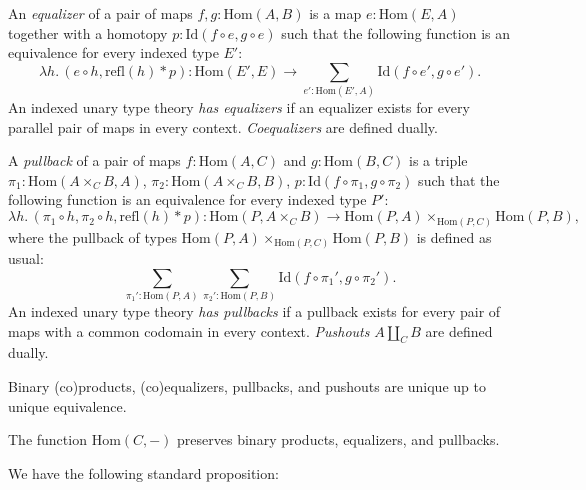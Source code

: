 \documentclass[reqno]{amsart}
\theoremstyle{definition}
\theoremstyle{remark}
\newcommand{\fs}[1]{\mathrm{#1}}
\newcommand{\Hom}{\fs{Hom}}
\newcommand{\Id}{\fs{Id}}
\newcommand{\refl}{\fs{refl}}
\numberwithin{figure}{section}
\begin{document}
An \emph{equalizer} of a pair of maps $f,g : \Hom(A,B)$ is a map $e : \Hom(E,A)$ together with a homotopy $p : \Id(f \circ e, g \circ e)$
such that the following function is an equivalence for every indexed type $E'$:
\[ \lambda h.\,(e \circ h, \refl(h) * p) : \Hom(E', E) \to \sum_{e' : \Hom(E',A)} \Id(f \circ e', g \circ e'). \]
An indexed unary type theory \emph{has equalizers} if an equalizer exists for every parallel pair of maps in every context.
\emph{Coequalizers} are defined dually.

A \emph{pullback} of a pair of maps $f : \Hom(A,C)$ and $g : \Hom(B,C)$ is a triple $\pi_1 : \Hom(A \times_C B, A)$, $\pi_2 : \Hom(A \times_C B, B)$, $p : \Id(f \circ \pi_1, g \circ \pi_2)$
such that the following function is an equivalence for every indexed type $P'$:
\[ \lambda h.\,(\pi_1 \circ h, \pi_2 \circ h, \refl(h) * p) : \Hom(P, A \times_C B) \to \Hom(P,A) \times_{\Hom(P,C)} \Hom(P,B), \]
where the pullback of types $\Hom(P,A) \times_{\Hom(P,C)} \Hom(P,B)$ is defined as usual:
\[ \sum_{\pi_1' : \Hom(P,A)} \sum_{\pi_2' : \Hom(P,B)} \Id(f \circ \pi_1', g \circ \pi_2'). \]
An indexed unary type theory \emph{has pullbacks} if a pullback exists for every pair of maps with a common codomain in every context.
\emph{Pushouts} $A \amalg_C B$ are defined dually.

\begin{remark}
Binary (co)products, (co)equalizers, pullbacks, and pushouts are unique up to unique equivalence.
\end{remark}

\begin{remark}
The function $\Hom(C,-)$ preserves binary products, equalizers, and pullbacks.
\end{remark}

We have the following standard proposition:
\end{document}
